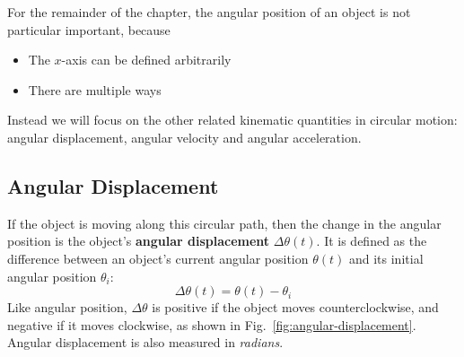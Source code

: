 For the remainder of the chapter, the angular position of an object is not
particular important, because
\begin{itemize}
\item The $x$-axis can be defined arbitrarily
\item There are multiple ways
\end{itemize}
Instead we will focus on the other related kinematic quantities in circular
motion: angular displacement, angular velocity and angular acceleration.


\subsection{Angular Displacement}
If the object is moving along this circular path, then the change in the
angular position is the object's \textbf{angular displacement}
$\Delta\theta(t)$. It is defined as the difference between an object's current
angular position $\theta(t)$ and its initial angular position $\theta_i$:
%
\begin{equation}
  \boxed{
    \Delta\theta(t)=\theta(t)-\theta_i
  }
  \label{eq:angular-displacement}
\end{equation}
Like angular position, $\Delta\theta$ is positive if the object moves
counterclockwise, and negative if it moves clockwise, as shown in
Fig.~\ref{fig:angular-displacement}. Angular displacement is also measured in
\emph{radians}.

